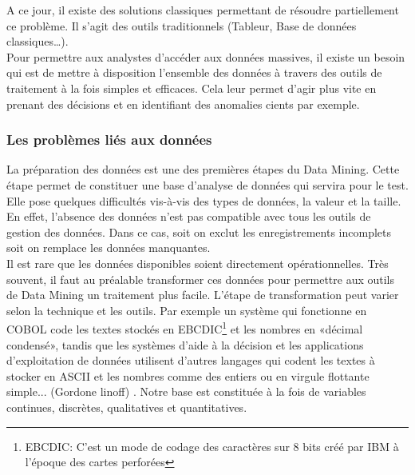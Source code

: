 \documentclass[11pt,a4paper]{report}
\begin{document}
%
%
%

A ce jour, il existe des solutions classiques permettant de résoudre partiellement ce problème. Il s’agit des outils traditionnels (Tableur, Base de données classiques…).\\

Pour permettre aux analystes d’accéder aux données massives, il existe un besoin qui est de mettre à disposition l'ensemble des données à travers des outils de traitement à la fois simples et efficaces. Cela leur permet d’agir plus vite en prenant des décisions et en identifiant des anomalies cients par exemple. \newline



\subsubsection{Les problèmes liés aux données}
La préparation des données est une des premières étapes du Data Mining. Cette étape permet de constituer une base d'analyse de données qui servira pour le test. Elle pose quelques difficultés vis-à-vis des types de données, la valeur et la taille.
En effet, l'absence des données n'est pas compatible avec tous les outils de gestion des données. Dans ce cas, soit on exclut les enregistrements incomplets soit on remplace les données manquantes.\\ 
Il est rare que les données disponibles soient directement opérationnelles. Très souvent, il faut au préalable transformer ces données pour permettre aux outils de Data Mining un traitement plus facile. L’étape de transformation peut varier selon la technique et les outils. Par exemple un système qui fonctionne en COBOL code les textes stockés en EBCDIC\footnote{EBCDIC: C'est un mode de codage des caractères sur 8 bits créé par IBM à l'époque des cartes perforées } et les nombres en «décimal condensé», tandis que les systèmes d’aide à la décision et les applications d’exploitation de données utilisent d’autres langages qui codent les textes à stocker en ASCII et les nombres comme des entiers ou en virgule flottante simple... (Gordone linoff) \cite{concepts}. Notre base est constituée à la fois de variables continues, discrètes, qualitatives et quantitatives.\\
 
\end{document}
